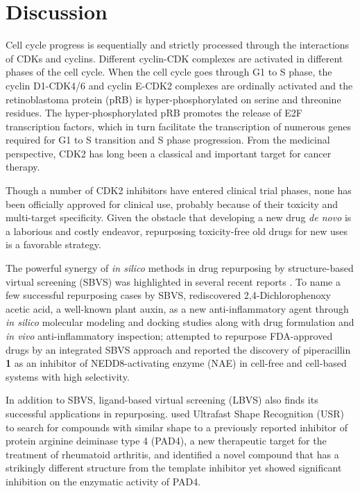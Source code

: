 \documentclass[10pt]{article}
\begin{document}
\section*{Discussion}

Cell cycle progress is sequentially and strictly processed through the interactions of CDKs and cyclins. Different cyclin-CDK complexes are activated in different phases of the cell cycle. When the cell cycle goes through G1 to S phase, the cyclin D1-CDK4/6 and cyclin E-CDK2 complexes are ordinally activated and the retinoblastoma protein (pRB) is hyper-phosphorylated on serine and threonine residues. The hyper-phosphorylated pRB promotes the release of E2F transcription factors, which in turn facilitate the transcription of numerous genes required for G1 to S transition and S phase progression. From the medicinal perspective, CDK2 has long been a classical and important target for cancer therapy.

Though a number of CDK2 inhibitors have entered clinical trial phases, none has been officially approved for clinical use, probably because of their toxicity and multi-target specificity. Given the obstacle that developing a new drug \textit{de novo} is a laborious and costly endeavor, repurposing toxicity-free old drugs for new uses is a favorable strategy.

The powerful synergy of \textit{in silico} methods in drug repurposing by structure-based virtual screening (SBVS) was highlighted in several recent reports \cite{1384}. To name a few successful repurposing cases by SBVS, \cite{1507} rediscovered 2,4-Dichlorophenoxy acetic acid, a well-known plant auxin, as a new anti-inflammatory agent through \textit{in silico} molecular modeling and docking studies along with drug formulation and \textit{in vivo} anti-inflammatory inspection; \cite{1506} attempted to repurpose FDA-approved drugs by an integrated SBVS approach and reported the discovery of piperacillin \textbf{1} as an inhibitor of NEDD8-activating enzyme (NAE) in cell-free and cell-based systems with high selectivity.

In addition to SBVS, ligand-based virtual screening (LBVS) also finds its successful applications in repurposing. \cite{1504} used Ultrafast Shape Recognition (USR) \cite{1379} to search for compounds with similar shape to a previously reported inhibitor of protein arginine deiminase type 4 (PAD4), a new therapeutic target for the treatment of rheumatoid arthritis, and identified a novel compound that has a strikingly different structure from the template inhibitor yet showed significant inhibition on the enzymatic activity of PAD4.
\end{document}
